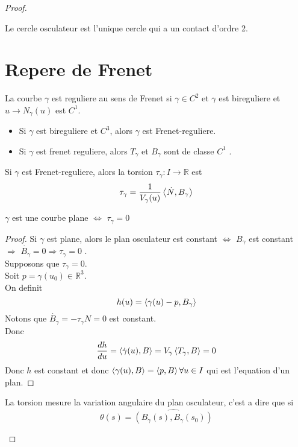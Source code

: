 \documentclass[../main.tex]{subfiles}
\begin{document}
\begin{proof}
\begin{defn}
\end{defn}
\begin{propo}
Le cercle osculateur est l'unique cercle qui a un contact d'ordre 2.
\end{propo}
\section{Repere de Frenet}
\begin{defn}
	La courbe $\gamma$ est reguliere au sens de Frenet si $\gamma \in C^{2}$ et $\gamma$ est bireguliere et $u \to N_{\gamma} ( u) $ est $C^{1}$.
\end{defn}
\begin{rmq}
	\begin{itemize}
	\item Si $\gamma$ est bireguliere et $C^{3}$, alors $\gamma$ est Frenet-reguliere.

	\item Si $\gamma$ est frenet reguliere, alors $T_{\gamma} $ et $B_\gamma$ sont de classe $C^{1}$ .		
	\end{itemize}
	
\end{rmq}
Si $\gamma$ est Frenet-reguliere, alors la torsion $\tau_{\gamma} : I \to \mathbb{R}$ est
\[ 
	\tau_{\gamma} = \frac{1}{V_{\gamma} ( u) }\left\langle \dot N, B_{\gamma} \right\rangle 
\]
\begin{propo}
$\gamma$ est une courbe plane $\iff$ $\tau_{\gamma} =0$ 
\end{propo}
\begin{proof}
Si $\gamma$ est plane, alors le plan osculateur est constant $\iff$  $B_{\gamma} $ est constant $\Rightarrow$ $\dot { B_{\gamma} } =0 \Rightarrow \tau_{\gamma} =0$ .\\
Supposons que $\tau_{\gamma} =0$.\\
Soit $p=\gamma( u_0) \in \mathbb{R}^{3}$.\\
On definit
\[ 
	h( u) = \left\langle \gamma( u) -p, B_{\gamma} \right\rangle 
\]
Notons que $\dot { B_{\gamma} }= - \tau_{\gamma} N =0 $ est constant.\\
Donc
\[ 
	\frac{dh}{du}= \left\langle\dot { \gamma} ( u) , B\right\rangle = V_{\gamma} \left\langle T_{\gamma} , B\right\rangle =0
\]
Donc $h$ est constant et donc $\left\langle \gamma( u) , B\right\rangle = \left\langle p,B\right\rangle \forall u \in I$ qui est l'equation d'un plan.	
\end{proof}
\begin{propo}
La torsion mesure la variation angulaire du plan osculateur, c'est a dire que si 
\[ 
	\theta( s) =\hat { ( B_{\gamma} ( s) ,B_{\gamma } ( s_0) ) } 
\]


\end{propo}
\end{proof}
\end{document}
